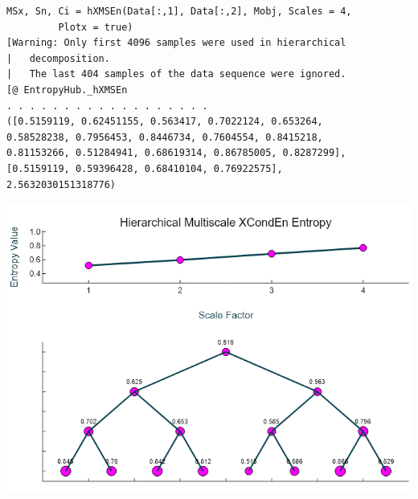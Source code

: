 \documentclass[12pt, a4paper, titlepage, openany]{book}
\begin{document}
\begin{verbatim}
MSx, Sn, Ci = hXMSEn(Data[:,1], Data[:,2], Mobj, Scales = 4,
		 Plotx = true)
[Warning: Only first 4096 samples were used in hierarchical 
|	decomposition.
|   The last 404 samples of the data sequence were ignored.
[@ EntropyHub._hXMSEn 
. . . . . . . . . . . . . . . . . .
([0.5159119, 0.62451155, 0.563417, 0.7022124, 0.653264, 
0.58528238, 0.7956453, 0.8446734, 0.7604554, 0.8415218, 
0.81153266, 0.51284941, 0.68619314, 0.86785005, 0.8287299], 
[0.5159119, 0.59396428, 0.68410104, 0.76922575],
2.5632030151318776)
\end{verbatim}
\includegraphics[scale=.5]{hXMSEnjl.png}\newline \newline



\newpage
\end{document}

